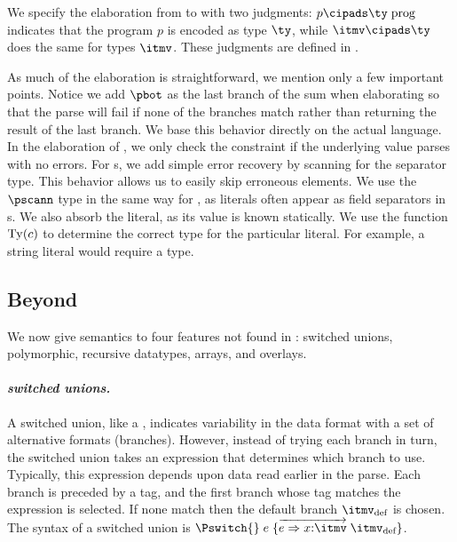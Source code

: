 We specify the elaboration from \ipads{} to \ddc{} with two judgments:
 $p \cipads \ty\; \text{prog}$ indicates that the \ipads{} program
$p$ is encoded as \ddc{} type $\ty$, while $\itmv \cipads \ty$
does the same for \ipads{} types $\itmv$. These judgments are defined
in .

As much of the elaboration is straightforward, we mention only a few
important points. Notice we add $\pbot$ as the
last branch of the \ddc{} sum when elaborating \Punion{} so that the
parse will fail if none of the branches match rather than returning
the result of the last branch. We base this behavior
  directly on the actual \padsc{} language. In the elaboration of
\Pwhere{}, we only check the constraint if the underlying value parses
with no errors. For \Parray{}s, we add simple error recovery by
scanning for the separator type.  This behavior allows us to easily
skip erroneous elements. We use the $\pscann$ type in the same way for
, as literals often appear as field separators in
\Pstruct{}s.  We also absorb the literal, as its value is known
statically.  We use the function ${\rm Ty}(c)$ to determine the
correct type for the particular literal. For example, a string
literal would require a \Pstring{} type.

\subsection{Beyond \ipads{}}

We now give semantics to four features not found in \ipads{}: \padsc{}
switched unions, \padsml{} polymorphic, recursive datatypes,
\datascript{} arrays, and \packettypes{} overlays.

\paragraph{\em \padsc{} switched unions.}
A switched union, like a \Punion, indicates variability in the data
format with a set of alternative formats (branches). However, instead
of trying each branch in turn, the switched union takes an expression that
determines which branch to use. Typically, this expression depends upon data read earlier in the parse. Each branch is preceded by a tag,
and the first branch whose tag matches the expression is selected.
If none match then the default branch $\itmv_{\text{def}}$ is chosen.
The syntax of a switched union is $\Pswitch{}\;e\;\{\overrightarrow{e
  \Rightarrow x{:}\itmv}\; \itmv_{\text{def}}\}$.


